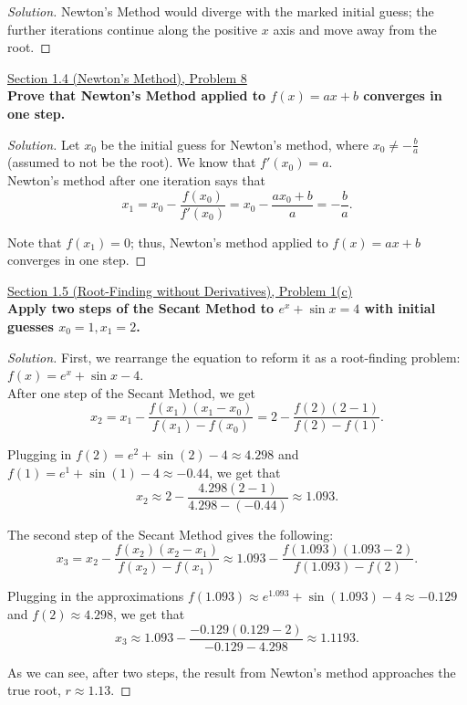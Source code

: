 \documentclass[11pt]{article}
\newenvironment{solution}
  {\renewcommand\qedsymbol{$\blacksquare$}\begin{proof}[Solution]}
  {\end{proof}}
\theoremstyle{definition}
\begin{document}
\begin{solution}
    Newton's Method would diverge with the marked initial guess; the further iterations continue along the positive $x$ axis and move away from the root.
\end{solution}

\newpage

\underline{Section 1.4 (Newton's Method), Problem 8} \\


\textbf{Prove that Newton's Method applied to $f(x) = ax + b$ converges in one step.} 

\begin{solution}
Let $x_0$ be the initial guess for Newton's method, where $x_0 \neq -\frac{b}{a}$ (assumed to not be the root). We know that $f'(x_0) = a$. \\

Newton's method after one iteration says that 
\[ x_1 = x_0 - \frac{f(x_0)}{f'(x_0)} = x_0 - \frac{ax_0 + b}{a} = -\frac{b}{a}. \]

Note that $f(x_1) = 0$; thus, Newton's method applied to $f(x) = ax+b$ converges in one step.
\end{solution}

\vspace{1.5cm}

\underline{Section 1.5 (Root-Finding without Derivatives), Problem 1(c)} \\

\textbf{Apply two steps of the Secant Method to $e^x + \sin x = 4$ with initial guesses $x_0 = 1, x_1 = 2$.} 

\begin{solution}

First, we rearrange the equation to reform it as a root-finding problem: $f(x) = e^x + \sin x - 4.$ \\

After one step of the Secant Method, we get 
\[ x_2 = x_1 - \frac{f(x_1)(x_1 - x_0)}{f(x_1) - f(x_0)} = 2 - \frac{f(2)(2-1)}{f(2) - f(1)}. \]

Plugging in $f(2) = e^2 + \sin(2) - 4 \approx 4.298$ and $f(1) = e^1 + \sin(1) - 4 \approx -0.44$, we get that
\[ x_2 \approx 2 - \frac{4.298(2-1)}{4.298 - (-0.44)} \approx 1.093. \]

The second step of the Secant Method gives the following:
\[ x_3 = x_2 - \frac{f(x_2)(x_2 - x_1)}{f(x_2) - f(x_1)} \approx 1.093 - \frac{f(1.093)(1.093 - 2)}{f(1.093) - f(2)}. \]

Plugging in the approximations $f(1.093) \approx e^{1.093} + \sin(1.093) - 4 \approx -0.129$ and $f(2) \approx 4.298$, we get that
\[ x_3 \approx 1.093 - \frac{-0.129(0.129 - 2)}{-0.129 - 4.298} \approx \boxed{1.1193}. \]

As we can see, after two steps, the result from Newton's method approaches the true root, $r \approx 1.13.$
\end{solution}
\end{document}
